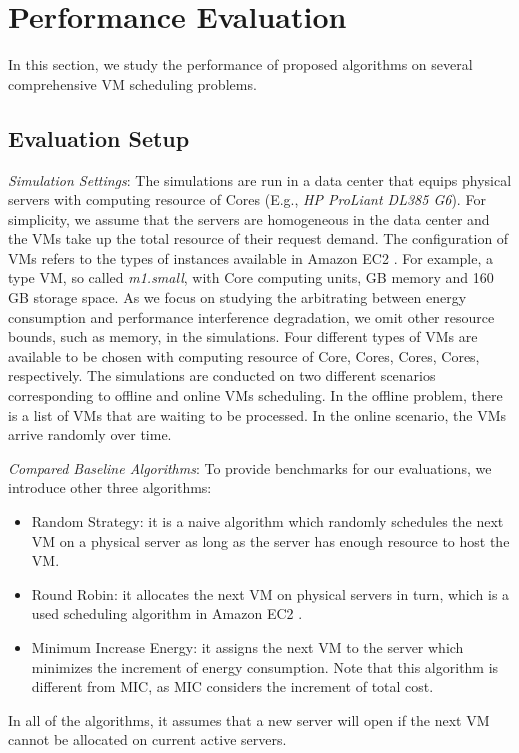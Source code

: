 \documentclass[10pt,journal]{IEEEtran}
\begin{document}
\section{Performance Evaluation}
\label{sec:exp}
In this section, we study the performance of proposed algorithms on several comprehensive VM scheduling problems.

\subsection{Evaluation Setup}
\textit{Simulation Settings}: The simulations are run in a data center that equips physical servers with computing resource of  Cores (E.g., \textit{HP ProLiant DL385 G6}). For simplicity, we assume that the servers are homogeneous in the data center and the VMs take up the total resource of their request demand. The configuration of VMs refers to the types of instances available in Amazon EC2 \cite{Amazon}. For example, a type VM, so called \textit{m1.small}, with  Core computing units,  GB memory and 160 GB storage space. As we focus on studying the arbitrating between energy consumption and performance interference degradation, we omit other resource bounds, such as memory, in the simulations. Four different types of VMs are available to be chosen with computing resource of  Core,  Cores,  Cores,  Cores, respectively. The simulations are conducted on two different scenarios corresponding to offline and online VMs scheduling. In the offline problem, there is a list of VMs that are waiting to be processed. In the online scenario, the VMs arrive randomly over time.

\textit{Compared Baseline Algorithms}: To provide benchmarks for our evaluations, we introduce other three algorithms:
\begin{itemize}
\item Random Strategy: it is a naive algorithm which randomly schedules the next VM on a physical server as long as the server has enough resource to host the VM.
\item Round Robin: it allocates the next VM on physical servers in turn, which is a used scheduling algorithm in Amazon EC2 \cite{Amazon}.
\item Minimum Increase Energy: it assigns the next VM to the server which minimizes the increment of energy consumption. Note that this algorithm is different from MIC, as MIC considers the increment of total cost. 
\end{itemize}

In all of the algorithms, it assumes that a new server will open if the next VM cannot be allocated on current active servers.
\end{document}
